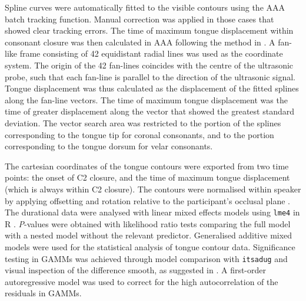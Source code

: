 \documentclass[authoryear, twocolumn]{elsarticle}
\begin{document}

Spline curves were automatically fitted to the visible contours using
the AAA batch tracking function. Manual correction was applied in those
cases that showed clear tracking errors. The time of maximum tongue
displacement within consonant closure was then calculated in AAA
following the method in \citet{strycharczuk2015}. A fan-like frame
consisting of 42 equidistant radial lines was used as the coordinate
system. The origin of the 42 fan-lines coincides with the centre of the
ultrasonic probe, such that each fan-line is parallel to the direction
of the ultrasonic signal. Tongue displacement was thus calculated as the
displacement of the fitted splines along the fan-line vectors. The time
of maximum tongue displacement was the time of greater displacement
along the vector that showed the greatest standard deviation. The vector
search area was restricted to the portion of the splines corresponding
to the tongue tip for coronal consonants, and to the portion
corresponding to the tongue dorsum for velar consonants.

The cartesian coordinates of the tongue contours were exported from two
time points: the onset of C2 closure, and the time of maximum tongue
displacement (which is always within C2 closure). The contours were
normalised within speaker by applying offsetting and rotation relative
to the participant's occlusal plane \citep{scobbie2011}. The durational
data were analysed with linear mixed effects models using \texttt{lme4}
in R \citep{r-core-team2017, bates2015}. \emph{P}-values were obtained
with likelihood ratio tests comparing the full model with a nested model
without the relevant predictor. Generalised additive mixed models
\citep[GAMMs,][]{wood2006, zuur2012} were used for the statistical
analysis of tongue contour data. Significance testing in GAMMs was
achieved through model comparison with \texttt{itsadug}
\citep{van-rij2017} and visual inspection of the difference smooth, as
suggested in \citet{soskuthy2017}. A first-order autoregressive model
was used to correct for the high autocorrelation of the residuals in
GAMMs.
\end{document}
